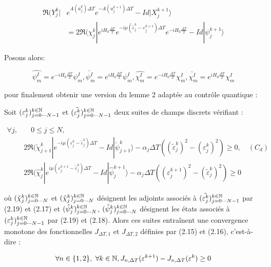 \begin{align*}
\Re(Y^k_j |& e^{A(\overline{u}^k_j)\Delta T} e^{-A(u^{k+1}_j)\Delta T}-Id|X^{k+1}_j\rangle\\
& = 2 \Re(\chi^k_j| e^{iH_0 \frac{\Delta T}{2}} e^{-i\mu (\tilde{\varepsilon}^k_j - \varepsilon^{k+1}_j)\Delta T} e^{ -iH_0 \frac{\Delta T}{2}} -Id|\psi^{k+1}_j\rangle
\end{align*}

Posons alors:

\begin{equation}
\hat{\psi^I_m} = e^{-iH_0 \frac{\Delta T}{2}} \psi^I_m, \check{\psi^I_m} = e^{iH_0 \frac{\Delta T}{2}} \psi^I_m,\hat{\chi^I_m} = e^{-iH_0 \frac{\Delta T}{2}} \chi^I_m, \check{\chi^I_m} = e^{iH_0 \frac{\Delta T}{2}} \chi^I_m
\end{equation}

pour finalement obtenir une version du lemme 2 adaptée au contrôle quantique :

\begin{lemme}
	Soit $(\varepsilon_j^k)^{k\in\mathbb N}_{j = 0\cdots N-1}$ et $(\tilde{\varepsilon_j^k})^{k\in\mathbb N}_{j = 0\cdots N-1}$ deux suites de champs discrets vérifiant :
	
	\begin{align*}
	\forall j,& \quad 0\leq j\leq N,\\
	& 2\Re(\check{\chi}^k_{j+1}|e^{-i\mu(\varepsilon^k_j-\tilde{\varepsilon}^k_j)\Delta T}-Id|\check{\psi}^k_{j+1}\rangle - \alpha_j \Delta T ((\tilde{\varepsilon}^k_j)^2-(\varepsilon^k_j)^2) \geq 0,\quad (C_d)\\
	& 2\Re(\hat{\chi}^k_j|e^{i\mu(\varepsilon^{k+1}_j-\tilde{\varepsilon}^k_j)\Delta T}-Id|\hat{\psi}^{k+1}_j\rangle - \alpha_j \Delta T ((\varepsilon^{k+1}_j)^2-(\tilde{\varepsilon}^k_j)^2) \geq 0
	\end{align*}
	
	où $(\check{\chi}_j^k)^{k\in\mathbb N}_{j = 0\cdots N}$ et $(\hat{\chi}_j^k)^{k\in\mathbb N}_{j = 0\cdots N}$ désignent les adjoints associés à $(\tilde{\varepsilon_j^k})^{k\in\mathbb N}_{j = 0\cdots N-1}$   par (2.19) et (2.17) et $(\hat{\psi}_j^k)^{k\in\mathbb N}_{j = 0\cdots N}$, $(\check{\psi}_j^k)^{k\in\mathbb N}_{j = 0\cdots N}$ désignent les états associés à $(\varepsilon_j^k)^{k\in\mathbb N}_{j = 0\cdots N-1}$ par (2.19) et (2.18). Alors ces suites entraînent une convergence monotone des fonctionnelles $J_{\Delta T,1}$ et $J_{\Delta T,2}$  définies par (2.15) et (2.16), c’est-à-dire :
	
	$$ \forall n \in \{1,2\},\  \forall k \in \mathbb N, J_{n,\Delta T}(\varepsilon^{k+1}) - J_{n,\Delta T}(\varepsilon^k)\geq 0 $$
	
\end{lemme}


